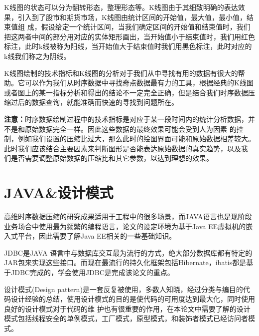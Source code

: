 K线图的状态可以分为翻转形态，整理形态等。K线图由于其细致明确的表达效果，引入到了股市和期货市场，K线图由统计区间的开始值，最大值，最小值，结束值组
成，假设给定一个统计区间，当我们确定区间的开始值和结束值时，我们把这两者中间的部分用对应的实体矩形画出，当开始值小于结束值时，我们用红色标注，此时k线被称为阳线，当开始值大于结束值时我们用黑色标注，此时对应的k线我们称之为阴线。

K线图绘制的技术指标和K线图的分析对于我们从中寻找有用的数据有很大的帮助。它可以作为我们从时序数据中寻找奇点数据最有力的工具，根据经典的K线图或者图上的某一指标分析和得出的结论不一定完全正确，但是结合我们时序数据压缩过后的数据查询，就能准确而快速的寻找到问题所在。

\textbf{注意：}时序数据绘制过程中的技术指标是对应于某一段时间内的统计分析数据，并不是和原始数据完全一样。因此这些数据的最终效果可能会受到人为因素
的控制，例如我们设置的压缩比过大，那么此时的绘图界面可能和原始数据相差较大。此时我们应该结合主要因素来判断图形是否能表达原始数据的真实趋势，以及我
们是否需要调整原始数据的压缩比和其它参数，以达到理想的效果。


\section{JAVA\&设计模式}
\label{Section 2.4}

高维时序数据压缩的研究成果适用于工程中的很多场景，而JAVA语言也是现阶段业务场合中使用最为频繁的编程语言，论文的设定环境为基于Java 
EE虚拟机的嵌入式平台，因此需要了解Java EE相关的一些基础知识。


JDBC是JAVA 语言中与数据库交互最为流行的方式，绝大部分数据库都有特定的JAR包来实现这些接口。而现在最流行的持久化框架包括Hibernate，ibatis都是基
于JDBC完成的，学会使用JDBC是完成该论文的重点。

设计模式(Design pattern)是一套反复被使用，多数人知晓，经过分类与编目的代码设计经验的总结，使用设计模式的目的是使代码的可用度达到最大化，同时使用良好的设计模式对于代码的维
护也有很重要的作用，在本论文中需要了解的设计模式包括线程安全的单例模式，工厂模式，原型模式，和装饰者模式已经访问者模式。








